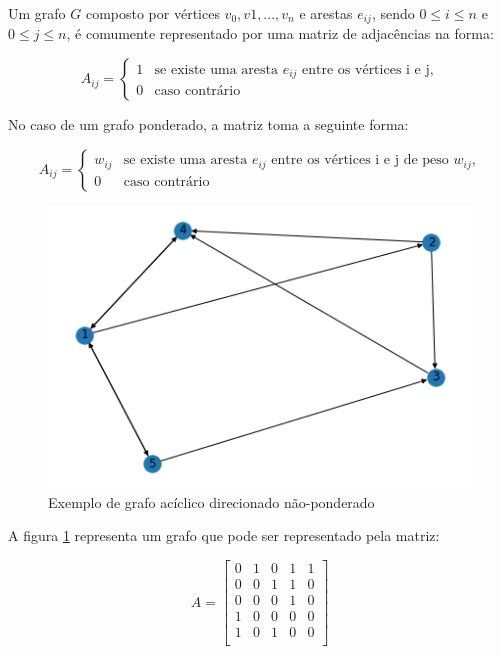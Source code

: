 Um grafo $G$ composto por vértices $v_0, v1, ..., v_n$ e arestas $e_{ij}$, sendo $0 \leq i \leq n$ e $0 \leq j \leq n$, é comumente representado por uma matriz de adjacências na forma:

\begin{equation}
A_{ij} = \begin{cases}
1 & \mbox{se existe uma aresta $e_{ij}$ entre os vértices i e j,}\\
0 & \mbox{caso contrário}
\end{cases}
\end{equation}

No caso de um grafo ponderado, a matriz toma a seguinte forma:

\begin{equation}
A_{ij} = \begin{cases}
w_{ij} & \mbox{se existe uma aresta $e_{ij}$ entre os vértices i e j de peso $w_{ij}$,}\\
0 & \mbox{caso contrário}
\end{cases}
\end{equation}

\begin{figure}[htb]
 \caption{Exemplo de grafo acíclico direcionado não-ponderado}
 \label{fig:redes1:grafo-exemplo}
 \centering
 \includegraphics[scale=0.7]{images/redes-1-grafo-exemplo.png}
 \fautor
\end{figure}

A figura \ref{fig:redes1:grafo-exemplo} representa um grafo que pode ser representado pela matriz:

\begin{equation}
A = \begin{bmatrix}
0 & 1 & 0 & 1 & 1 \\
0 & 0 & 1 & 1 & 0 \\
0 & 0 & 0 & 1 & 0 \\
1 & 0 & 0 & 0 & 0 \\
1 & 0 & 1 & 0 & 0 \\
\end{bmatrix}
\end{equation}

